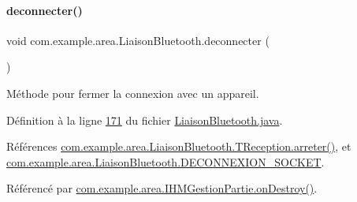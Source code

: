 \mbox{\label{classcom_1_1example_1_1area_1_1_liaison_bluetooth_a10b356586feed95ecacb0a57cb51f0e6}} 
\paragraph{\texorpdfstring{deconnecter()}{deconnecter()}}
{\footnotesize\ttfamily void com.\+example.\+area.\+Liaison\+Bluetooth.\+deconnecter (\begin{DoxyParamCaption}{ }\end{DoxyParamCaption})}



Méthode pour fermer la connexion avec un appareil. 



Définition à la ligne \hyperlink{_liaison_bluetooth_8java_source_l00171}{171} du fichier \hyperlink{_liaison_bluetooth_8java_source}{Liaison\+Bluetooth.\+java}.



Références \hyperlink{_liaison_bluetooth_8java_source_l00287}{com.\+example.\+area.\+Liaison\+Bluetooth.\+T\+Reception.\+arreter()}, et \hyperlink{_liaison_bluetooth_8java_source_l00037}{com.\+example.\+area.\+Liaison\+Bluetooth.\+D\+E\+C\+O\+N\+N\+E\+X\+I\+O\+N\+\_\+\+S\+O\+C\+K\+ET}.



Référencé par \hyperlink{_i_h_m_gestion_partie_8java_source_l00169}{com.\+example.\+area.\+I\+H\+M\+Gestion\+Partie.\+on\+Destroy()}.


